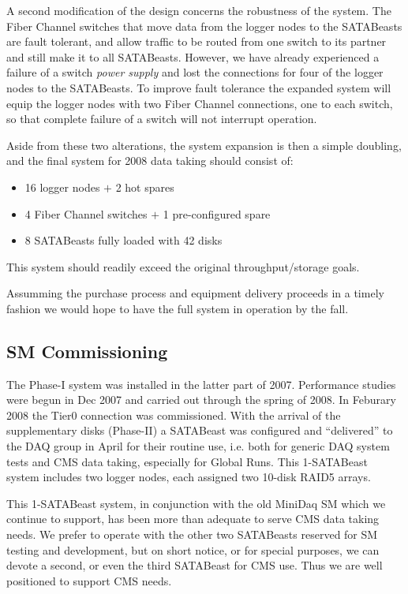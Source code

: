 A second modification of the design concerns the robustness of the system.
The Fiber Channel switches that move data from the logger nodes to the 
SATABeasts are fault tolerant, and allow traffic to be routed from one
switch to its partner and still make it to all SATABeasts. 
However, we have already experienced a failure of a switch {\it power supply}
and lost the connections for four of the logger nodes to the  SATABeasts.
To improve fault tolerance the expanded system will equip the logger nodes
with two Fiber Channel connections, one to each switch, so that complete failure of a switch
will not interrupt operation.

Aside from these two alterations, the system expansion is then a simple doubling,
and the final system for 2008 data taking should consist of:
\begin{itemize}
\item 16 logger nodes $+$ 2 hot spares
\item 4 Fiber Channel switches $+$ 1 pre-configured spare
\item 8 SATABeasts fully loaded with 42 disks
\end{itemize}
This system should readily exceed the original throughput/storage goals.

Assumming the purchase process and equipment delivery proceeds in a timely
fashion we would hope to have the full system in operation by the fall.


\subsection{SM Commissioning\label{sec:SMcommiss}}

The Phase-I system was installed in the latter part of 2007.
Performance studies were begun in Dec 2007 and carried out through the spring of 2008.
In Feburary 2008 the Tier0 connection was commissioned.
With the arrival of the supplementary disks (Phase-II) a SATABeast was configured
and ``delivered'' to the DAQ group in April for their routine use,
i.e. both for generic DAQ system tests and CMS data taking, especially for Global Runs.
This 1-SATABeast system includes two logger nodes, each assigned two 10-disk RAID5
arrays.

This 1-SATABeast system, in conjunction with the old MiniDaq SM which we continue
to support, has been more than adequate to serve CMS data taking needs.
We prefer to operate with the other two SATABeasts reserved for SM testing
and development, but on short notice, or for special purposes, we can devote
a second, or even the third SATABeast for CMS use.
Thus we are well positioned to support CMS needs.


